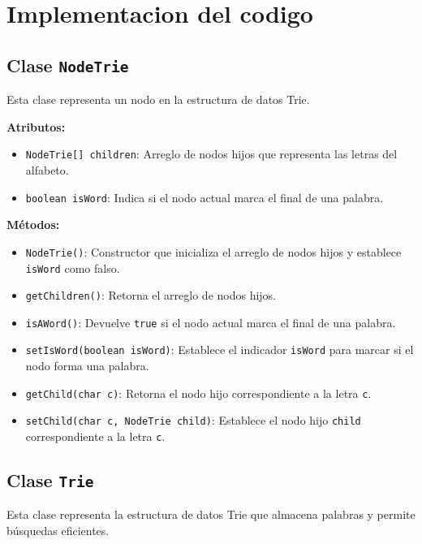 \section{Implementacion del codigo}


\subsection{Clase \texttt{NodeTrie}}
Esta clase representa un nodo en la estructura de datos Trie.

\textbf{Atributos:}
\begin{itemize}
    \item \texttt{NodeTrie[] children}: Arreglo de nodos hijos que representa las letras del alfabeto.
    \item \texttt{boolean isWord}: Indica si el nodo actual marca el final de una palabra.
\end{itemize}

\textbf{Métodos:}
\begin{itemize}
    \item \texttt{NodeTrie()}: Constructor que inicializa el arreglo de nodos hijos y establece \texttt{isWord} como falso.
    \item \texttt{getChildren()}: Retorna el arreglo de nodos hijos.
    \item \texttt{isAWord()}: Devuelve \texttt{true} si el nodo actual marca el final de una palabra.
    \item \texttt{setIsWord(boolean isWord)}: Establece el indicador \texttt{isWord} para marcar si el nodo forma una palabra.
    \item \texttt{getChild(char c)}: Retorna el nodo hijo correspondiente a la letra \texttt{c}.
    \item \texttt{setChild(char c, NodeTrie child)}: Establece el nodo hijo \texttt{child} correspondiente a la letra \texttt{c}.
\end{itemize}



\subsection{Clase \texttt{Trie}}
Esta clase representa la estructura de datos Trie que almacena palabras y permite búsquedas eficientes.

